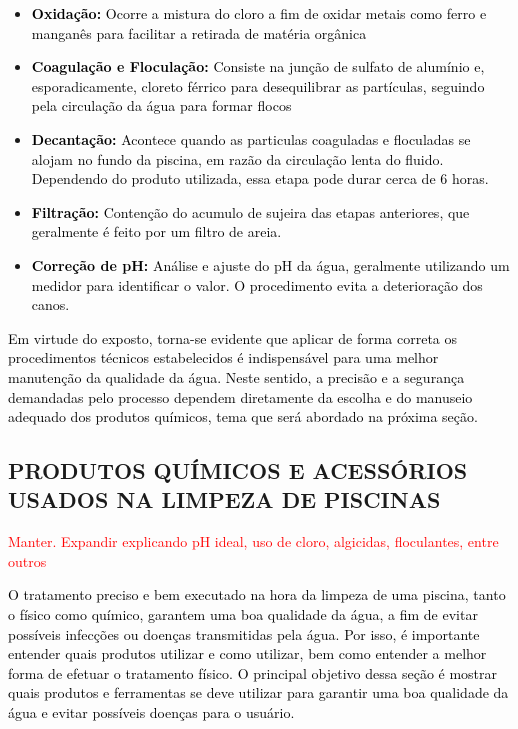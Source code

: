         \begin{itemize}
            \item \textbf{\textcolor{black}{Oxidação:}} \textcolor{black}{Ocorre a mistura do cloro a fim de oxidar metais como ferro e manganês para facilitar a retirada de matéria orgânica}
            
            \item \textbf{\textcolor{black}{Coagulação e Floculação:}} \textcolor{black}{Consiste na junção de sulfato de alumínio e, esporadicamente, cloreto férrico para desequilibrar as partículas, seguindo pela circulação da água para formar flocos}
             
            \item \textbf{\textcolor{black}{Decantação:}} \textcolor{black}{Acontece quando as particulas coaguladas e floculadas se alojam no fundo da piscina, em razão da circulação lenta do fluido. Dependendo do produto utilizada, essa etapa pode durar cerca de 6 horas.}

            \item \textbf{\textcolor{black}{Filtração:}} \textcolor{black}{Contenção do acumulo de sujeira das etapas anteriores, que geralmente é feito por um filtro de areia.}

            \item \textbf{\textcolor{black}{Correção de pH:}} \textcolor{black}{Análise e ajuste do pH da água, geralmente utilizando um medidor para identificar o valor. O procedimento evita a deterioração dos canos.}
            
        \end{itemize}

        \textcolor{black}{Em virtude do exposto, torna-se evidente que aplicar de forma correta os procedimentos técnicos estabelecidos é indispensável para uma melhor manutenção da qualidade da água. Neste sentido, a precisão e a segurança demandadas pelo processo dependem diretamente da escolha e do manuseio adequado dos produtos químicos, tema que será abordado na próxima seção.}


    \subsection{PRODUTOS QUÍMICOS E ACESSÓRIOS USADOS NA LIMPEZA DE PISCINAS}
        \textcolor{red}{Manter. Expandir explicando pH ideal, uso de cloro, algicidas, floculantes, entre outros}

        \textcolor{black}{O tratamento preciso e bem executado na hora da limpeza de uma piscina, tanto o físico como químico, garantem uma boa qualidade da água, a fim de evitar possíveis infecções ou doenças transmitidas pela água. Por isso, é importante entender quais produtos utilizar e como utilizar, bem como entender a melhor forma de efetuar o tratamento físico. O principal objetivo dessa seção é mostrar quais produtos e ferramentas se deve utilizar para garantir uma boa qualidade da água e evitar possíveis doenças para o usuário.}

